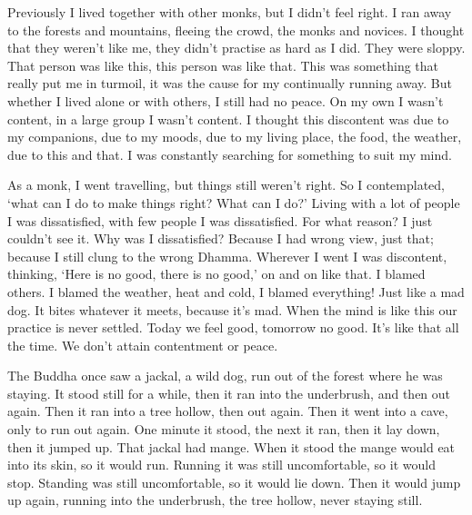 Previously I lived together with other monks, but I didn't feel right. I ran away to the forests and mountains, fleeing the crowd, the monks and novices. I thought that they weren't like me, they didn't practise as hard as I did. They were sloppy. That person was like this, this person was like that. This was something that really put me in turmoil, it was the cause for my continually running away. But whether I lived alone or with others, I still had no peace. On my own I wasn't content, in a large group I wasn't content. I thought this discontent was due to my companions, due to my moods, due to my living place, the food, the weather, due to this and that. I was constantly searching for something to suit my mind. 

As a  monk, I went travelling, but things still weren't right. So I contemplated, `what can I do to make things right? What can I do?' Living with a lot of people I was dissatisfied, with few people I was dissatisfied. For what reason? I just couldn't see it. Why was I dissatisfied? Because I had wrong view, just that; because I still clung to the wrong Dhamma. Wherever I went I was discontent, thinking, `Here is no good, there is no good,' on and on like that. I blamed others. I blamed the weather, heat and cold, I blamed everything! Just like a mad dog. It bites whatever it meets, because it's mad. When the mind is like this our practice is never settled. Today we feel good, tomorrow no good. It's like that all the time. We don't attain contentment or peace. 

The Buddha once saw a jackal, a wild dog, run out of the forest where he was staying. It stood still for a while, then it ran into the underbrush, and then out again. Then it ran into a tree hollow, then out again. Then it went into a cave, only to run out again. One minute it stood, the next it ran, then it lay down, then it jumped up. That jackal had mange. When it stood the mange would eat into its skin, so it would run. Running it was still uncomfortable, so it would stop. Standing was still uncomfortable, so it would lie down. Then it would jump up again, running into the underbrush, the tree hollow, never staying still. 

